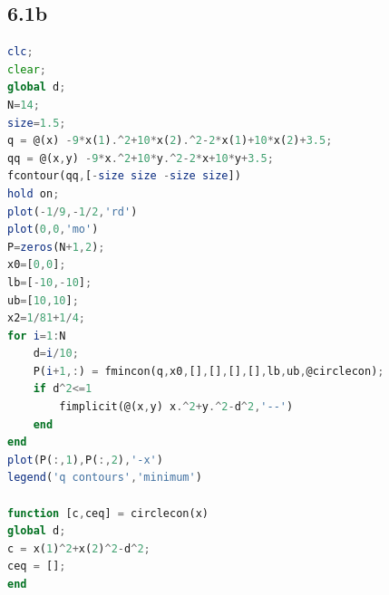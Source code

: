 \documentclass[UTF8]{ctexart}
\begin{document}
\subsection*{6.1b}
\begin{lstlisting}[language=Octave]
clc;
clear;
global d;
N=14;
size=1.5;
q = @(x) -9*x(1).^2+10*x(2).^2-2*x(1)+10*x(2)+3.5;
qq = @(x,y) -9*x.^2+10*y.^2-2*x+10*y+3.5;
fcontour(qq,[-size size -size size])
hold on;
plot(-1/9,-1/2,'rd')
plot(0,0,'mo')
P=zeros(N+1,2);
x0=[0,0];
lb=[-10,-10];
ub=[10,10];
x2=1/81+1/4;
for i=1:N
    d=i/10;
    P(i+1,:) = fmincon(q,x0,[],[],[],[],lb,ub,@circlecon);
    if d^2<=1
        fimplicit(@(x,y) x.^2+y.^2-d^2,'--')
    end
end
plot(P(:,1),P(:,2),'-x')
legend('q contours','minimum')

function [c,ceq] = circlecon(x)
global d;
c = x(1)^2+x(2)^2-d^2;
ceq = [];
end
\end{lstlisting}
\end{document}
